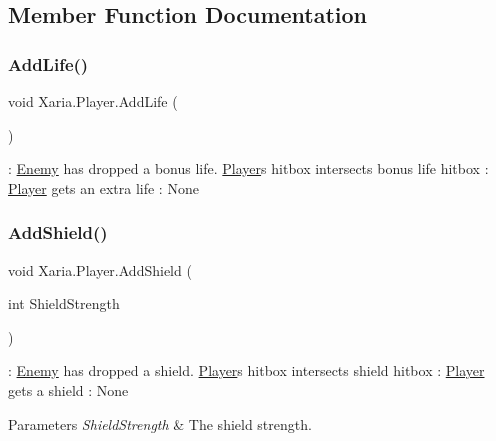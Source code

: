 \subsection{Member Function Documentation}
\mbox{\label{classXaria_1_1Player_a21b21585a59e7768ba843b8051d99a90}} 
\subsubsection{\texorpdfstring{Add\+Life()}{AddLife()}}
{\footnotesize\ttfamily void Xaria.\+Player.\+Add\+Life (\begin{DoxyParamCaption}{ }\end{DoxyParamCaption})\hspace{0.3cm}{\ttfamily [inline]}}



\+: \hyperlink{classXaria_1_1Enemy}{Enemy} has dropped a bonus life. \hyperlink{classXaria_1_1Player}{Player}\textquotesingle{}s hitbox intersects bonus life hitbox \+: \hyperlink{classXaria_1_1Player}{Player} gets an extra life \+: None 

\mbox{\label{classXaria_1_1Player_aff15ed23c2465062f0c70e3a2a5e8a86}} 
\subsubsection{\texorpdfstring{Add\+Shield()}{AddShield()}}
{\footnotesize\ttfamily void Xaria.\+Player.\+Add\+Shield (\begin{DoxyParamCaption}\item[{int}]{Shield\+Strength }\end{DoxyParamCaption})\hspace{0.3cm}{\ttfamily [inline]}}



\+: \hyperlink{classXaria_1_1Enemy}{Enemy} has dropped a shield. \hyperlink{classXaria_1_1Player}{Player}\textquotesingle{}s hitbox intersects shield hitbox \+: \hyperlink{classXaria_1_1Player}{Player} gets a shield \+: None 


\begin{DoxyParams}{Parameters}
{\em Shield\+Strength} & The shield strength.\\
\hline
\end{DoxyParams}
\mbox{\label{classXaria_1_1Player_ad5ad5b8517ebdacc8ed917ab8aaa6b51}} 
